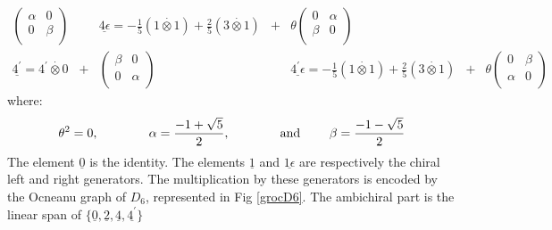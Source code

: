 \documentclass[a4paper,11pt]{article}
\def\text#1{\mbox{\rm #1\ }}
\def \otimesdot {\stackrel{\cdot}{\otimes}}
\newcommand{\ud}[1]{\underline{#1}}
\begin{document}
$$\begin{array}{cccclcc}
\left( \begin{array}{cc} \alpha & 0 \\ 0 & \beta \\ \end{array} \right)
&{}&
\underline{4\epsilon} = -\frac{1}{5} (1 \otimesdot 1) + \frac{2}{5} (3
\otimesdot 1)                     &+&
\theta \left( \begin{array}{cc} 0 & \alpha \\ \beta & 0 \\
\end{array} \right) \\
\underline{4^{'}}     = 4^{'} \otimesdot 0 &+&
\left( \begin{array}{cc} \beta & 0 \\ 0 & \alpha \\ \end{array} \right)
&{}&
\underline{4^{'}\epsilon} = -\frac{1}{5} (1 \otimesdot 1) + \frac{2}{5}
(3 \otimesdot 1)                      &+&
\theta \left( \begin{array}{cc} 0 & \beta \\ \alpha & 0 \\ \end{array} \right)
\end{array}
$$
where:
$$
\theta^2 = 0, \qquad \qquad
\alpha   = \frac{-1+\sqrt{5}}{2}, \qquad \qquad
\text{and} \qquad
\beta    = \frac{-1-\sqrt{5}}{2}
$$
The element $\underline{0}$ is the identity. The elements
$\underline{1}$ and $\underline{1\epsilon}$ are respectively the
chiral left and right generators.
The multiplication by these generators is encoded by the Ocneanu
graph of $D_6$, represented in Fig \ref{grocD6}.
The ambichiral part is the linear span of $\{ \ud0, \ud{2}, \ud{4},
\ud{4^{'}} \}$
\end{document}
